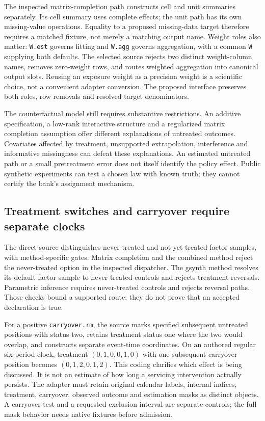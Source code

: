 The inspected matrix-completion path constructs cell and unit summaries
separately. Its cell summary uses complete effects; the unit path has its
own missing-value operations. Equality to a proposed missing-data target
therefore requires a matched fixture, not merely a matching output name.
Weight roles also matter: \texttt{W.est} governs fitting and \texttt{W.agg}
governs aggregation, with a common \texttt{W} supplying both defaults.
The selected source rejects two distinct weight-column names, removes
zero-weight rows, and routes weighted aggregation into canonical output
slots. Reusing an exposure weight as a precision weight is a scientific
choice, not a convenient adapter conversion. The proposed interface
preserves both roles, row removals and resolved target denominators.
\citep{exec24_fect_source,exec21_gsynth_engine}

The counterfactual model still requires substantive restrictions. An
additive specification, a low-rank interactive structure and a regularized
matrix completion assumption offer different explanations of untreated
outcomes. Covariates affected by treatment, unsupported extrapolation,
interference and informative missingness can defeat these explanations.
An estimated untreated path or a small pretreatment error does not itself
identify the policy effect. Public synthetic experiments can test a chosen
law with known truth; they cannot certify the bank's assignment mechanism.
\citep{exec24_fect_choice}

\subsection{Treatment switches and carryover require separate clocks}
The direct source distinguishes never-treated and not-yet-treated factor
samples, with method-specific gates. Matrix completion and the combined
method reject the never-treated option in the inspected dispatcher.
The gsynth method resolves its default factor sample to never-treated
controls and rejects treatment reversals. Parametric inference requires
never-treated controls and rejects reversal paths. Those checks bound a
supported route; they do not prove that an accepted declaration is true.
\citep{exec24_fect_source}

For a positive \texttt{carryover.rm}, the source marks specified subsequent
untreated positions with status two, retains treatment status one where
the two would overlap, and constructs separate event-time coordinates.
On an authored regular six-period clock, treatment $(0,1,0,0,1,0)$ with
one subsequent carryover position becomes $(0,1,2,0,1,2)$. This coding
clarifies which effect is being discussed. It is not an estimate of how
long a servicing intervention actually persists. The adapter must retain
original calendar labels, internal indices, treatment, carryover, observed
outcome and estimation masks as distinct objects. A carryover test and a
requested exclusion interval are separate controls; the full mask behavior
needs native fixtures before admission.\citep{exec24_fect_source,exec24_fect_choice}

